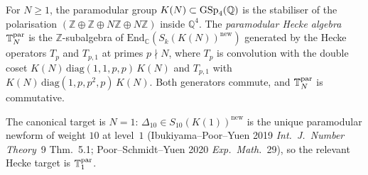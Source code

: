 \begin{definition}
\label{def:dl-paramodular-hecke}
For $N\ge 1$, the paramodular group
$K(N)\subset\operatorname{GSp}_4(\mathbb{Q})$ is the stabiliser of the polarisation
$(\mathbb{Z}\oplus\mathbb{Z}\oplus N\mathbb{Z}\oplus N\mathbb{Z})$
inside $\mathbb{Q}^4$. The \emph{paramodular Hecke algebra}
$\mathbb{T}^{\mathrm{par}}_N$ is the $\mathbb{Z}$-subalgebra of
$\mathrm{End}_{\mathbb{C}}(S_k(K(N))^{\mathrm{new}})$ generated by the
Hecke operators $T_p$ and $T_{p,1}$ at primes $p\nmid N$, where $T_p$
is convolution with the double coset
$K(N)\,\mathrm{diag}(1,1,p,p)\,K(N)$ and $T_{p,1}$ with
$K(N)\,\mathrm{diag}(1,p,p^2,p)\,K(N)$. Both generators commute, and
$\mathbb{T}^{\mathrm{par}}_N$ is commutative.
\end{definition}

The canonical target is $N=1$: $\Delta_{10}\in S_{10}(K(1))^{\mathrm{new}}$
is the unique paramodular newform of weight $10$ at level~$1$
(Ibukiyama--Poor--Yuen 2019 \emph{Int.\ J.\ Number Theory}\ 9 Thm.~5.1;
Poor--Schmidt--Yuen 2020 \emph{Exp.\ Math.}\ 29), so the relevant Hecke
target is $\mathbb{T}^{\mathrm{par}}_1$.

